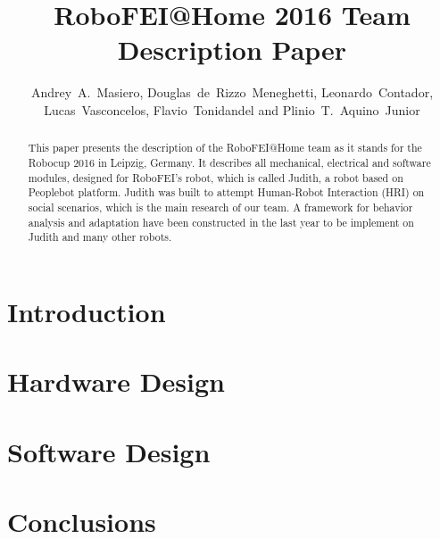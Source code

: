 \documentclass[runningheads,a4paper]{llncs}
\begin{document}
\title{RoboFEI@Home 2016 Team Description Paper}
\author{Andrey~A.~Masiero, Douglas~de~Rizzo~Meneghetti, Leonardo~Contador, Lucas~Vasconcelos, Flavio~Tonidandel and Plinio~T.~Aquino~Junior}

\maketitle



\begin{abstract}
This paper presents the description of the RoboFEI@Home team as it stands for the Robocup 2016 in Leipzig, Germany. It describes all mechanical, electrical and software modules, designed for RoboFEI's robot, which is called Judith, a robot based on Peoplebot platform. Judith was built to attempt Human-Robot Interaction (HRI) on social scenarios, which is the main research of our team. A framework for behavior analysis and adaptation have been constructed in the last year to be implement on Judith and many other robots.
\end{abstract}


\section{Introduction}


\section{Hardware Design}


\section{Software Design}


\section{Conclusions}




\end{document}
